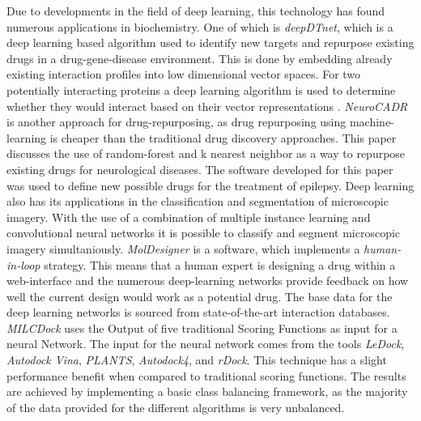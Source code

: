 Due to developments in the field of deep learning, this technology has found numerous applications in biochemistry\cite{Chen2018}.
One of which is \textit{deepDTnet}, which is a deep learning based algorithm used to identify new targets and repurpose existing drugs in a drug-gene-disease environment.
This is done by embedding already existing interaction profiles into low dimensional vector spaces.
For two potentially interacting proteins a deep learning algorithm is used to determine whether they would interact based on their vector representations \cite{Zeng}.
\textit{NeuroCADR} is another approach for drug-repurposing, as drug repurposing using machine-learning is cheaper than the traditional drug discovery approaches.
This paper discusses the use of random-forest and k nearest neighbor as a way to repurpose existing drugs for neurological diseases.
The software developed for this paper was used to define new possible drugs for the treatment of epilepsy.\cite[]{Mamidala2023}
Deep learning also has its applications in the classification and segmentation of microscopic imagery.
With the use of a combination of multiple instance learning and convolutional neural networks it is possible to classify and segment 
microscopic imagery simultaniously\cite{Kraus2016}.
\textit{MolDesigner} is a software, which implements a \textit{human-in-loop} strategy. This means that a human expert is designing a drug within a web-interface and the 
numerous deep-learning networks provide feedback on how well the current design would work as a potential drug.
The base data for the deep learning networks is sourced from state-of-the-art interaction databases\cite[]{Huang2020}.
\textit{MILCDock} uses the Output of five traditional Scoring Functions as input for a neural Network. 
The input for the neural network comes from the tools \textit{LeDock}\cite[]{Zhang2016}, \textit{Autodock Vina}\cite[]{Trott2010}, \textit{PLANTS}\cite[]{Korb2006},  \textit{Autodock4}\cite[]{Morris2009}, and \textit{rDock}\cite[]{RuizCarmona2014}. 
This technique has a slight performance benefit when compared to traditional scoring functions.
The results are achieved by implementing a basic class balancing framework, as the majority of the data provided for the different algorithms is
very unbalanced\cite[]{Morris2022}.
\newpage